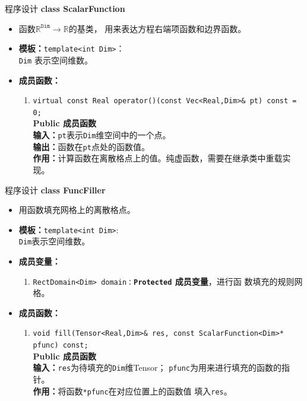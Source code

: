 \documentclass{beamer}
\begin{document}
\begin{frame}{程序设计}
  \textbf{\large class ScalarFunction}
\begin{itemize}
    \item 函数$\mathbb{R}^{\texttt{Dim}}\rightarrow\mathbb{R}$的基类，
      用来表达方程右端项函数和边界函数。
    \item \textbf{模板：}\texttt{template<int Dim>}：\\\texttt{Dim} 表示空间维数。
    \item \textbf{成员函数：}
            \begin{enumerate}[(1)]
            \item \texttt{virtual const Real operator()(const Vec<Real,Dim>\& pt) const = 0;}\\
                \textbf{Public 成员函数}\\
                \textbf{输入：}\texttt{pt}表示\texttt{Dim}维空间中的一个点。\\
                \textbf{输出：}函数在\texttt{pt}点处的函数值。\\
                \textbf{作用：}计算函数在离散格点上的值。纯虚函数，需要在继承类中重载实现。

                 \end{enumerate}
               \end{itemize}
               
\end{frame}

\begin{frame}{程序设计}
  \textbf{\large class FuncFiller}
  \begin{itemize}
    \item 用函数填充网格上的离散格点。
    \item \textbf{模板：}\texttt{template<int Dim>}:\\
      \texttt{Dim}表示空间维数。
      \item \textbf{成员变量：}
        \begin{enumerate}[(1)]
            \item \texttt{RectDomain<Dim>
                domain：}\textbf{\texttt{Protected}  成员变量}，进行函
              数填充的规则网格。
        \end{enumerate}
    \item \textbf{成员函数：}
            \begin{enumerate}[(1)]
            \item \texttt{void fill(Tensor<Real,Dim>\& res, const ScalarFunction<Dim>* pfunc) const;}\\
                \textbf{Public 成员函数}\\
                \textbf{输入：}\texttt{res}为待填充的\texttt{Dim}维Tensor；
                \texttt{pfunc}为用来进行填充的函数的指针。\\
                \textbf{作用：}将函数\texttt{*pfunc}在对应位置上的函数值
                填入\texttt{res}。

            \end{enumerate}
\end{itemize}

  \end{frame}
\end{document}
